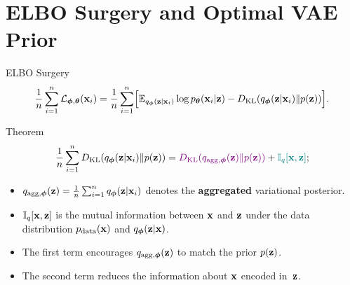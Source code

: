\documentclass{beamer}
\begin{document}
\section{ELBO Surgery and Optimal VAE Prior}
\begin{frame}{ELBO Surgery}
	\vspace{-0.3cm}
	\[
	    \frac{1}{n} \sum_{i=1}^n \mathcal{L}_{\boldsymbol{\phi}, \boldsymbol{\theta}}(\mathbf{x}_i) = \frac{1}{n} \sum_{i=1}^n \Bigl[ \mathbb{E}_{q_{\boldsymbol{\phi}}(\mathbf{z}| \mathbf{x}_i)} \log p_{\boldsymbol{\theta}}(\mathbf{x}_i | \mathbf{z}) - D_\mathrm{KL}(q_{\boldsymbol{\phi}}(\mathbf{z}| \mathbf{x}_i) \| p(\mathbf{z})) \Bigr].
	\]
    \eqpause
	\vspace{-0.3cm}
	\begin{block}{Theorem}
		\vspace{-0.5cm}
		\[
		    \frac{1}{n} \sum_{i=1}^n D_\mathrm{KL}(q_{\boldsymbol{\phi}}(\mathbf{z}| \mathbf{x}_i) \| p(\mathbf{z})) = {\color{violet} D_\mathrm{KL}(q_{\text{agg}, \boldsymbol{\phi}}(\mathbf{z}) \| p(\mathbf{z}))} + {\color{teal}\mathbb{I}_{q} [\mathbf{x}, \mathbf{z}]};
		\]
        \eqpause
		\vspace{-0.5cm}
		\begin{itemize}
			\item $q_{\text{agg}, \boldsymbol{\phi}}(\mathbf{z}) = \frac{1}{n} \sum_{i=1}^n q_{\boldsymbol{\phi}}(\mathbf{z}| \mathbf{x}_i)$ denotes the \textbf{aggregated} variational posterior.
			\item $\mathbb{I}_{q} [\mathbf{x}, \mathbf{z}]$ is the mutual information between $\mathbf{x}$ and $\mathbf{z}$ under the data distribution $p_{\text{data}}(\mathbf{x})$ and $q_{\boldsymbol{\phi}}(\mathbf{z}| \mathbf{x})$.
			\item  {\color{violet} The first term} encourages $q_{\text{agg}, \boldsymbol{\phi}}(\mathbf{z})$ to match the prior $p(\mathbf{z})$.
			\item {\color{teal} The second term} reduces the information about $\mathbf{x}$ encoded in~$\mathbf{z}$.
		\end{itemize}
	\end{block}
\end{frame}
\end{document}
